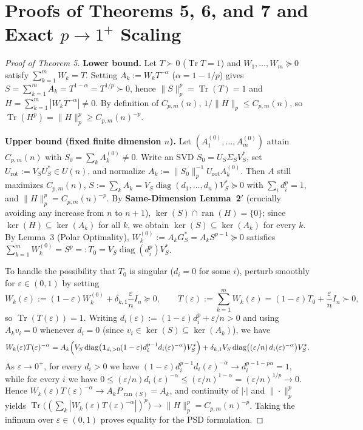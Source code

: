 \documentclass[10pt,letterpaper]{article}
\newcommand{\Tr}{\operatorname{Tr}}
\newcommand{\ran}{\operatorname{ran}}
\newcommand{\diag}{\operatorname{diag}}
\begin{document}
\section{Proofs of Theorems 5, 6, and 7 and Exact \texorpdfstring{$p \to 1^+$}{p -> 1+} Scaling}

\begin{proof}[Proof of Theorem 5]
\textbf{Lower bound.} Let $T \succ 0$ ($\Tr T = 1$) and $W_1,\dots,W_m \succeq 0$ satisfy $\sum_{k=1}^m W_k = T$. Setting $A_k := W_k T^{-\alpha}$ ($\alpha = 1 - 1/p$) gives $S = \sum_{k=1}^m A_k = T^{1-\alpha} = T^{1/p} \succ 0$, hence $\|S\|_p^p = \Tr(T) = 1$ and $H = \sum_{k=1}^m |W_k T^{-\alpha}| \neq 0$. By definition of $C_{p,m}(n)$, $1 / \|H\|_p \le C_{p,m}(n)$, so $\Tr(H^p) = \|H\|_p^p \ge C_{p,m}(n)^{-p}$.

\textbf{Upper bound (fixed finite dimension $n$).} Let $(A_1^{(0)},\dots,A_m^{(0)})$ attain $C_{p,m}(n)$ with $S_0 = \sum_k A_k^{(0)} \neq 0$. Write an SVD $S_0 = U_S \Sigma_S V_S^*$, set $U_{\mathrm{rot}} := V_S U_S^* \in U(n)$, and normalize $A_k := \|S_0\|_p^{-1} U_{\mathrm{rot}} A_k^{(0)}$. Then $A$ still maximizes $C_{p,m}(n)$, $S := \sum_k A_k = V_S \diag(d_1,\dots,d_n) V_S^* \succeq 0$ with $\sum_i d_i^p = 1$, and $\|H\|_p^p = C_{p,m}(n)^{-p}$. By \textbf{Same-Dimension Lemma~2$'$} (crucially avoiding any increase from $n$ to $n+1$), $\ker(S) \cap \ran(H) = \{0\}$; since $\ker(H) \subseteq \ker(A_k)$ for all $k$, we obtain $\ker(S) \subseteq \ker(A_k)$ for every $k$. By Lemma~3 (Polar Optimality), $W_k^{(0)} := A_k G_S^* = A_k S^{p-1} \succeq 0$ satisfies $\sum_{k=1}^m W_k^{(0)} = S^p =: T_0 = V_S \diag(d_i^p) V_S^*$.

To handle the possibility that $T_0$ is singular ($d_i = 0$ for some $i$), perturb smoothly for $\varepsilon \in (0, 1)$ by setting
\[
  W_k(\varepsilon) := (1 - \varepsilon) W_k^{(0)} + \delta_{k,1}\frac{\varepsilon}{n} I_n \succeq 0,
  \qquad T(\varepsilon) := \sum_{k=1}^m W_k(\varepsilon) = (1 - \varepsilon) T_0 + \frac{\varepsilon}{n} I_n \succ 0,
\]
so $\Tr(T(\varepsilon)) = 1$. Writing $d_i(\varepsilon) := (1-\varepsilon) d_i^p + \varepsilon/n > 0$ and using $A_k v_i = 0$ whenever $d_i = 0$ (since $v_i \in \ker(S) \subseteq \ker(A_k)$), we have
\[
  W_k(\varepsilon) T(\varepsilon)^{-\alpha} = A_k \Bigl(V_S \diag\bigl(\mathbf{1}_{d_i>0}(1-\varepsilon) d_i^{p-1} d_i(\varepsilon)^{-\alpha}\bigr) V_S^*\Bigr) + \delta_{k,1} V_S \diag\bigl((\varepsilon/n)\,d_i(\varepsilon)^{-\alpha}\bigr) V_S^*.
\]
As $\varepsilon \to 0^+$, for every $d_i > 0$ we have $(1-\varepsilon) d_i^{p-1} d_i(\varepsilon)^{-\alpha} \to d_i^{p-1 - p\alpha} = 1$, while for every $i$ we have $0 \le (\varepsilon/n) d_i(\varepsilon)^{-\alpha} \le (\varepsilon/n)^{1-\alpha} = (\varepsilon/n)^{1/p} \to 0$. Hence $W_k(\varepsilon) T(\varepsilon)^{-\alpha} \to A_k P_{\ran(S)} = A_k$, and continuity of $|\cdot|$ and $\|\cdot\|_p^p$ yields $\Tr\bigl((\sum_k |W_k(\varepsilon) T(\varepsilon)^{-\alpha}|)^p\bigr) \to \|H\|_p^p = C_{p,m}(n)^{-p}$. Taking the infimum over $\varepsilon \in (0,1)$ proves equality for the PSD formulation.


\end{proof}
\end{document}
